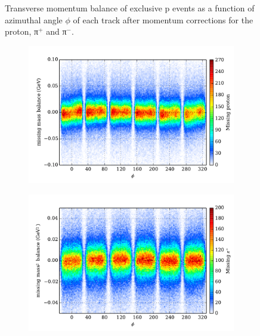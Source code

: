 \begin{figure}
\begin{center}
\begin{subfigure}{0.4\columnwidth}
\end{subfigure}
\caption[Momentum Balance Before Corrections]{\label{fig:pbal}Transverse momentum balance of exclusive p \π[+] \π[-] events as a function of azimuthal angle $\phi$ of each track after momentum corrections for the proton, π$^+$ and π$^-$.}
\end{center}\end{figure}

\begin{figure}\begin{center}
\begin{subfigure}{0.4\columnwidth}
    \includegraphics[width=\columnwidth]{figures/pcor/pcor_mpbal.pdf}
\end{subfigure}
\begin{subfigure}{0.4\columnwidth}
    \includegraphics[width=\columnwidth]{figures/pcor/pcor_mpipbal.pdf}
\end{subfigure}

\end{center}
\end{figure}
